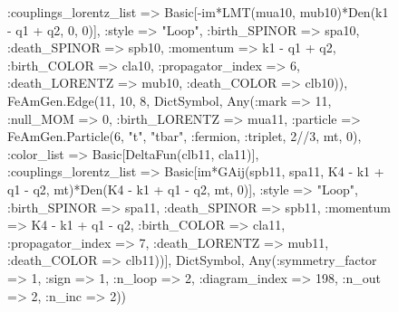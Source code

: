 \documentclass{revtex4}
\begin{document}
\begin{figure}[!htb]
\begin{center}
{:couplings_lorentz_list => Basic[-im*LMT(mua10, mub10)*Den(k1 - q1 + q2, 0, 0)], :style => "Loop", :birth_SPINOR => spa10, :death_SPINOR => spb10, :momentum => k1 - q1 + q2, :birth_COLOR => cla10, :propagator_index => 6, :death_LORENTZ => mub10, :death_COLOR => clb10)), FeAmGen.Edge(11, 10, 8, Dict{Symbol, Any}(:mark => 11, :null_MOM => 0, :birth_LORENTZ => mua11, :particle => FeAmGen.Particle(6, "t", "tbar", :fermion, :triplet, 2//3, mt, 0), :color_list => Basic[DeltaFun(clb11, cla11)], :couplings_lorentz_list => Basic[im*GAij(spb11, spa11, K4 - k1 + q1 - q2, mt)*Den(K4 - k1 + q1 - q2, mt, 0)], :style => "Loop", :birth_SPINOR => spa11, :death_SPINOR => spb11, :momentum => K4 - k1 + q1 - q2, :birth_COLOR => cla11, :propagator_index => 7, :death_LORENTZ => mub11, :death_COLOR => clb11))], Dict{Symbol, Any}(:symmetry_factor => 1, :sign => 1, :n_loop => 2, :diagram_index => 198, :n_out => 2, :n_inc => 2)) 
}
\end{center}
\end{figure}
\end{document}
